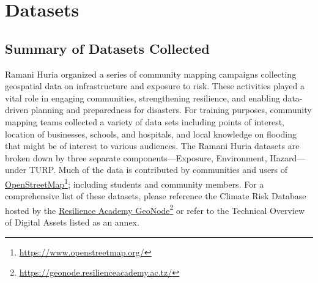 \documentclass[a4paper,12pt,twoside]{article}
\begin{document}
\newpage
\section{Datasets}

\subsection{Summary of Datasets Collected}
\begin{multicols}{2}


Ramani Huria organized a series of community mapping campaigns collecting geospatial data on infrastructure and exposure to risk. These activities played a vital role in engaging communities, strengthening resilience, and enabling data-driven planning and preparedness for disasters. 
For training purposes, community mapping teams collected a variety of data sets including points of interest, location of businesses, schools, and hospitals,  and local knowledge on flooding that might be of interest to various audiences.
The Ramani Huria datasets are broken down by three separate components—Exposure, Environment, Hazard—under TURP. Much of the data is contributed by communities and users of \href{https://www.openstreetmap.org/}{OpenStreetMap}\footnote{\url{https://www.openstreetmap.org/}}; including students and community members. For a comprehensive list of these datasets, please reference the Climate Risk Database hosted by the \href{https://geonode.resilienceacademy.ac.tz/}{Resilience Academy GeoNode}\footnote{\url{https://geonode.resilienceacademy.ac.tz/}} or refer to the Technical Overview of Digital Assets listed as an annex.


\end{multicols}
\end{document}
